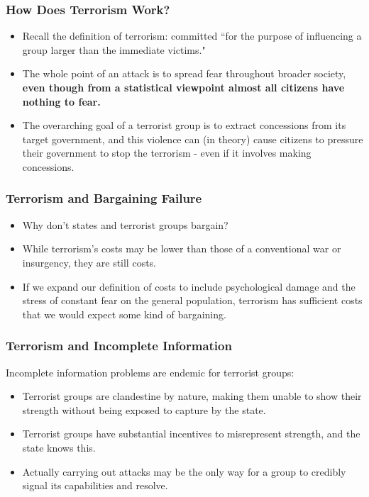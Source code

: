 \documentclass[handout]{beamer}
\begin{document}
\begin{frame} 
	\frametitle{\LARGE{How Does Terrorism Work?}}
	\begin{itemize}
		\item Recall the definition of terrorism: committed ``for the purpose of influencing a group larger than the immediate victims." \pause
		\item The whole point of an attack is to spread fear throughout broader society, \textbf{even though from a statistical viewpoint almost all citizens have nothing to fear.}
		\item The overarching goal of a terrorist group is to extract concessions from its target government, and this violence can (in theory) cause citizens to pressure their government to stop the terrorism - even if it involves making concessions.
	\end{itemize}
\end{frame}

\begin{frame} 
\frametitle{\LARGE{Terrorism and Bargaining Failure}}
\begin{itemize}
		\item Why don't states and terrorist groups bargain? \pause
		\item While terrorism's costs may be lower than those of a conventional war or insurgency, they are still costs. \pause
		\item If we expand our definition of costs to include psychological damage and the stress of constant fear on the general population, terrorism has sufficient costs that we would expect some kind of bargaining. 
\end{itemize}
\end{frame}

\begin{frame} 
\frametitle{\LARGE{Terrorism and Incomplete Information}}
Incomplete information problems are endemic for terrorist groups:
\begin{itemize}
		\item Terrorist groups are clandestine by nature, making them unable to show their strength without being exposed to capture by the state. \pause
		\item Terrorist groups have substantial incentives to misrepresent strength, and the state knows this. \pause
		\item Actually carrying out attacks may be the only way for a group to credibly signal its capabilities and resolve.
\end{itemize}
\end{frame}
\end{document}
